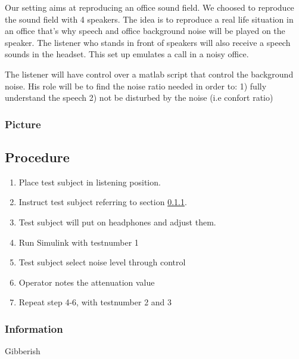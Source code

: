 Our setting aims at reproducing an office sound field. We choosed to reproduce the sound field with 4 speakers. 
The idea is to reproduce a real life situation in an office that's why speech and office background noise will be played on the speaker. 
The listener who stands in front of speakers will also receive a speech sounds in the headset. This set up emulates a call in a noisy office.

The listener will have control over a matlab script that control the background noise. His role will be to find the noise ratio needed in order to: 1) fully understand the speech 2) not be disturbed by the noise (i.e confort ratio)

\subsubsection{Picture}
\vspace{1cm}
\subsection{Procedure}

\begin{enumerate}
	\item Place test subject in listening position.
	\item Instruct test subject referring to section \ref{subsubsec:attenuationInformation}.
	\item Test subject will put on headphones and adjust them.
	\item Run Simulink  with testnumber 1
	\item Test subject select noise level through control
	\item Operator notes the attenuation value
	\item Repeat step 4-6, with testnumber 2 and 3
\end{enumerate}

\subsubsection{Information}\label{subsubsec:attenuationInformation}
Gibberish


